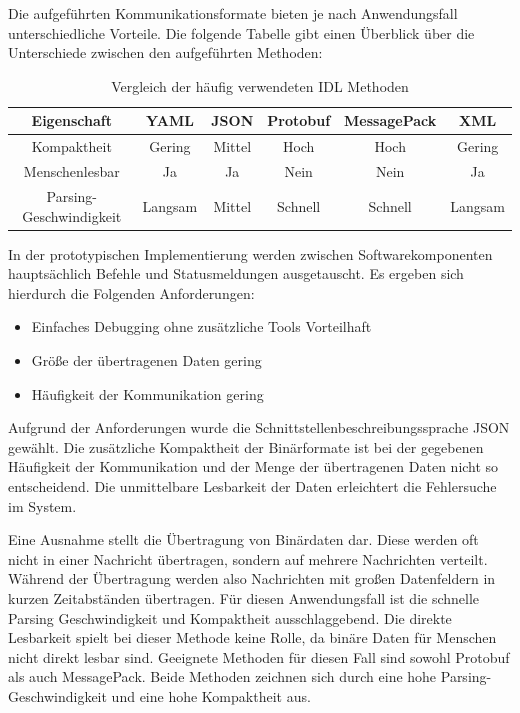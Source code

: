 Die aufgeführten Kommunikationsformate bieten je nach Anwendungsfall unterschiedliche Vorteile. Die folgende Tabelle gibt einen Überblick über die Unterschiede zwischen den aufgeführten Methoden:
\begin{table}
    \centering
    \begin{tabular}{|c||c|c|c|c|c|}
        \hline
        \textbf{Eigenschaft} & \textbf{YAML} & \textbf{JSON} & \textbf{Protobuf} & \textbf{MessagePack} & \textbf{XML} \\
        \hline
        \hline
        Kompaktheit & Gering & Mittel & Hoch & Hoch & Gering \\
        \hline
        Menschenlesbar & Ja & Ja & Nein & Nein & Ja \\
        \hline
        Parsing-Geschwindigkeit & Langsam & Mittel & Schnell & Schnell & Langsam \\
        \hline
    \end{tabular}
    \caption{Vergleich der häufig verwendeten \gls{IDL} Methoden}
\end{table}

In der prototypischen Implementierung werden zwischen Softwarekomponenten hauptsächlich Befehle und Statusmeldungen ausgetauscht. Es ergeben sich hierdurch die Folgenden Anforderungen:

\begin{itemize}
    \item Einfaches Debugging ohne zusätzliche Tools Vorteilhaft
    \item Größe der übertragenen Daten gering
    \item Häufigkeit der Kommunikation gering
\end{itemize}

Aufgrund der Anforderungen wurde die Schnittstellenbeschreibungssprache \gls{JSON} gewählt. Die zusätzliche Kompaktheit der Binärformate ist bei der gegebenen Häufigkeit der Kommunikation und der Menge der übertragenen Daten nicht so entscheidend. Die unmittelbare Lesbarkeit der Daten erleichtert die Fehlersuche im System.

Eine Ausnahme stellt die Übertragung von Binärdaten dar. Diese werden oft nicht in einer Nachricht übertragen, sondern auf mehrere Nachrichten verteilt. Während der Übertragung werden also Nachrichten mit großen Datenfeldern in kurzen Zeitabständen übertragen. Für diesen Anwendungsfall ist die schnelle Parsing Geschwindigkeit und Kompaktheit ausschlaggebend. Die direkte Lesbarkeit spielt bei dieser Methode keine Rolle, da binäre Daten für Menschen nicht direkt lesbar sind. Geeignete Methoden für diesen Fall sind sowohl Protobuf als auch MessagePack. Beide Methoden zeichnen sich durch eine hohe Parsing-Geschwindigkeit und eine hohe Kompaktheit aus.

